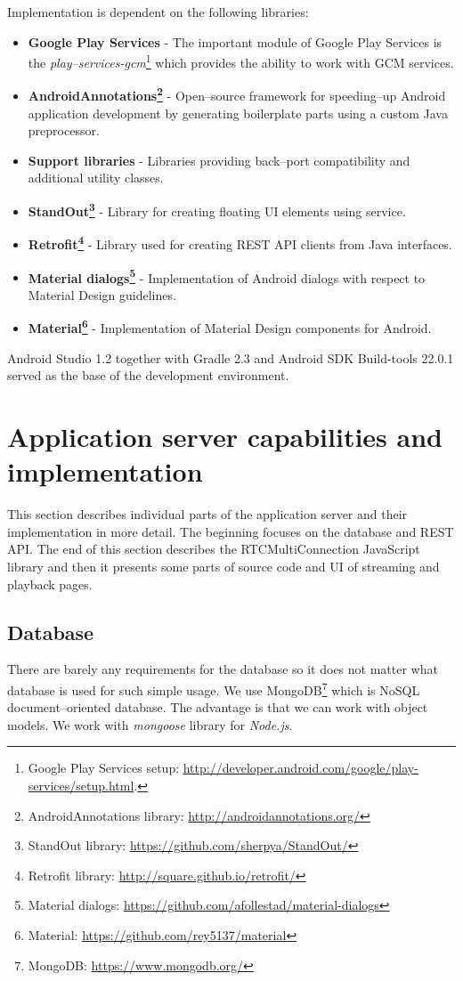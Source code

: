 \noindent
Implementation is dependent on the following libraries:
\begin{itemize}
	\item \textbf{Google Play Services} - The important module of Google Play Services is the \textit{play--services-gcm}\footnote{Google Play Services setup: \url{http://developer.android.com/google/play-services/setup.html}.} which provides the ability to work with GCM services.
	\item \textbf{AndroidAnnotations\footnote{AndroidAnnotations library: \url{http://androidannotations.org/}}} - Open--source framework for speeding--up Android application development by generating boilerplate parts using a custom Java preprocessor.
	\item \textbf{Support libraries} - Libraries providing back--port compatibility and additional utility classes.
	\item \textbf{StandOut\footnote{StandOut library: \url{https://github.com/sherpya/StandOut/}}} - Library for creating floating UI elements using service.
	\item \textbf{Retrofit\footnote{Retrofit library: \url{http://square.github.io/retrofit/}}} - Library used for creating REST API clients from Java interfaces.
	\item \textbf{Material dialogs\footnote{Material dialogs: \url{https://github.com/afollestad/material-dialogs}}} - Implementation of Android dialogs with respect to Material Design guidelines.
	\item \textbf{Material\footnote{Material: \url{https://github.com/rey5137/material}}} - Implementation of Material Design components for Android.
\end{itemize}

Android Studio 1.2 together with Gradle 2.3 and Android SDK Build-tools 22.0.1 served as the base of the development environment.




\section{Application server capabilities and implementation}
This section describes individual parts of the application server and their implementation in more detail. The beginning focuses on the database and REST API. The end of this section describes the RTCMultiConnection JavaScript library and then it presents some parts of source code and UI of streaming and playback pages.

\subsection{Database}
There are barely any requirements for the database so it does not matter what database is used for such simple usage. We use MongoDB\footnote{MongoDB: \url{https://www.mongodb.org/}} which is NoSQL document--oriented database. The advantage is that we can work with object models. We work with \textit{mongoose} library for \textit{Node.js}.\\

